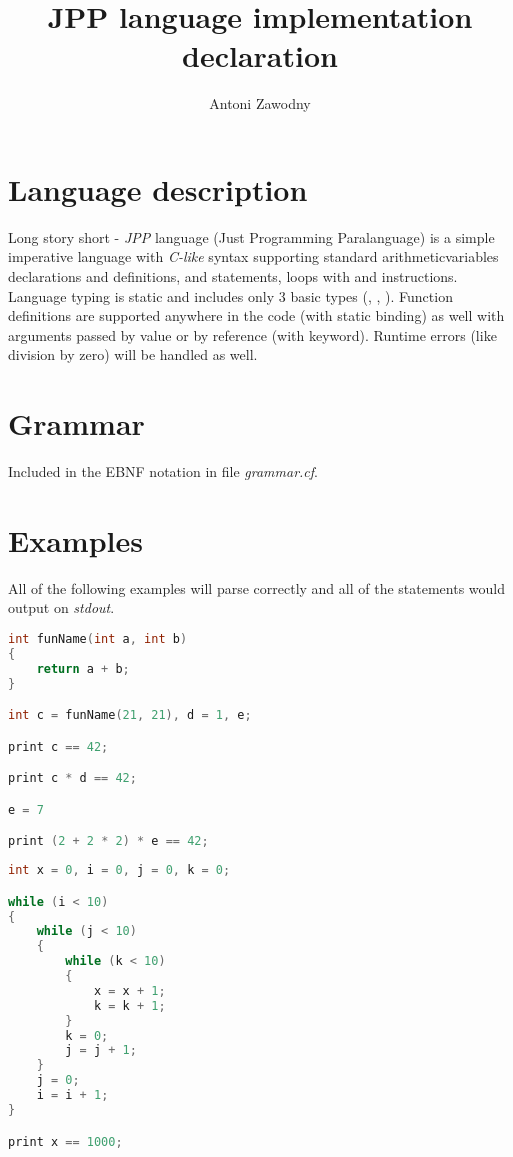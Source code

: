 \documentclass[11pt,a4paper]{article}
\title{JPP language implementation declaration}
\author{Antoni Zawodny}
\date{}
\newcommand{\jpp}[1]{\textit{\color{blue}{#1}}}
\begin{document}
\maketitle
\section*{Language description}
Long story short - \emph{JPP} language (Just Programming Paralanguage) is a simple imperative language with \emph{C-like} syntax supporting standard arithmeticvariables declarations and definitions, \jpp{if} and \jpp{if-else} statements, \jpp{while} loops with \jpp{break} and \jpp{continue} instructions. Language typing is static and includes only 3 basic types (\jpp{int}, \jpp{bool}, \jpp{string}). Function definitions are supported anywhere in the code (with static binding) as well with arguments passed by value or by reference (with \jpp{ref} keyword). Runtime errors (like division by zero) will be handled as well.

\section*{Grammar}
Included in the EBNF notation in file \emph{grammar.cf}.

\section*{Examples}
All of the following examples will parse correctly and all of the \jpp{print} statements would output \jpp{True} on \emph{stdout}.

\begin{lstlisting}[language=C, caption=Simple expressions]
int funName(int a, int b)
{
    return a + b;
}

int c = funName(21, 21), d = 1, e;

print c == 42;

print c * d == 42;

e = 7

print (2 + 2 * 2) * e == 42;
\end{lstlisting}

\begin{lstlisting}[language=C, caption=Simple loops]
int x = 0, i = 0, j = 0, k = 0;

while (i < 10)
{
    while (j < 10)
    {
        while (k < 10)
        {
            x = x + 1;
            k = k + 1;
        }
        k = 0;
        j = j + 1;
    }
    j = 0;
    i = i + 1;
}

print x == 1000;
\end{lstlisting}
\end{document}

